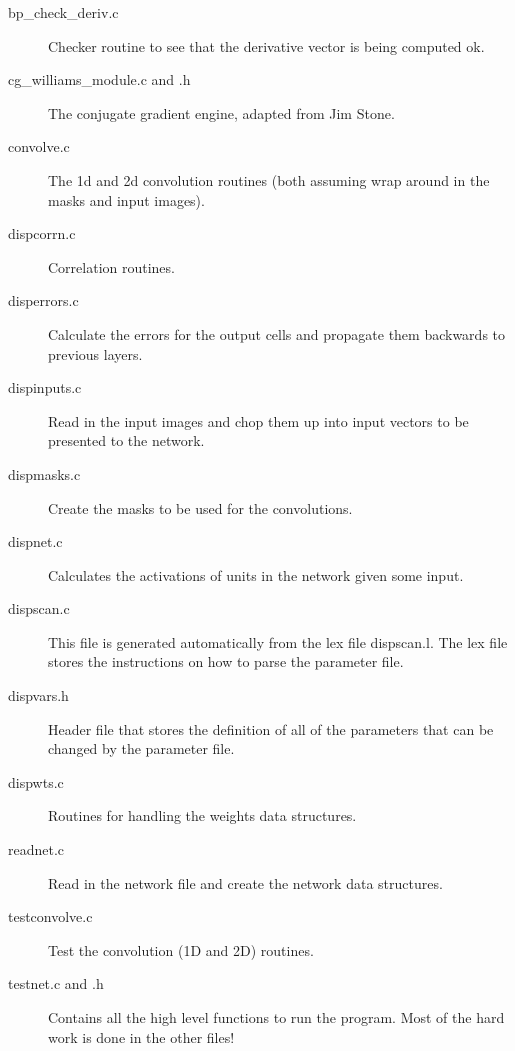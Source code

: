 \documentclass[a4paper]{article}
\begin{document}
\begin{description}

\item[bp\_check\_deriv.c]
Checker routine to see that the derivative vector is being computed ok.

\item[cg\_williams\_module.c and .h] 
The conjugate gradient engine, adapted from Jim Stone.

\item[convolve.c] 

The 1d and 2d convolution routines (both assuming wrap around in the
masks and input images).

\item[dispcorrn.c] Correlation routines.

\item [disperrors.c] 
  Calculate the errors for the output cells and propagate them
  backwards to previous layers.  

\item[dispinputs.c] 
Read in the input images and chop them up into input vectors to be
presented to the network.

\item[dispmasks.c] 
Create the masks to be used for the convolutions.

\item[dispnet.c] 
Calculates the activations of units in the network given some input.

  \item[dispscan.c]
    This file is generated automatically from the lex file dispscan.l.
    The lex file stores the instructions on how to parse the parameter file.

\item[dispvars.h] 
Header file that stores the definition of all of the parameters that
can be changed by the parameter file.

\item[dispwts.c] 
Routines for handling the weights data structures.

\item[readnet.c] 
  Read in the network file and create the network data structures.

\item[testconvolve.c] 
Test the convolution (1D and 2D) routines.

\item [testnet.c and .h]
  Contains all the high level functions to run the program.  Most of
  the hard work is done in the other files!


\end{description}
\end{document}
